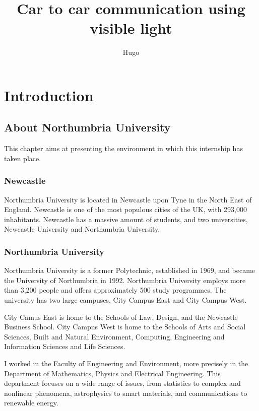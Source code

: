 \documentclass[12pt]{report}
\title{Car to car communication using visible light}
\author{Hugo}
\begin{document}
\maketitle

\tableofcontents








\chapter{Introduction}

\section{About Northumbria University}

This chapter aims at presenting the environment in which this internship has taken place.

\subsection{Newcastle}

Northumbria University is located in Newcastle upon Tyne in the North East of England. Newcastle is one of the most populous cities of the UK, with 293,000 inhabitants. Newcastle has a massive amount of students, and two universities, Newcastle University and Northumbria University.

\subsection{Northumbria University}

Northumbria University is a former Polytechnic, established in 1969, and became the University of Northumbria in 1992. Northumbria University employs more than 3,200 people and offers approximately 500 study programmes. The university has two large campuses, City Campus East and City Campus West.

City Camus East is home to the Schools of Law, Design, and the Newcastle Business School. City Campus West is home to the Schools of Arts and Social Sciences, Built and Natural Environment, Computing, Engineering and Information Sciences and Life Sciences.

I worked in the Faculty of Engineering and Environment, more precisely in the Department of Mathematics, Physics and Electrical Engineering. This department focuses on a wide range of issues, from statistics to complex and nonlinear phenomena, astrophysics to smart materials, and communications to renewable energy.
\end{document}
